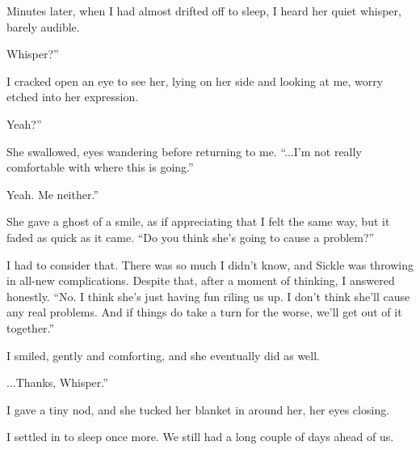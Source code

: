 Minutes later, when I had almost drifted off to sleep, I heard her quiet whisper, barely audible.

\leavevmode{}Whisper?”

I cracked open an eye to see her, lying on her side and looking at me, worry etched into her expression.

\leavevmode{}Yeah?”

She swallowed, eyes wandering before returning to me. “...I’m not really comfortable with where this is going.”

\leavevmode{}Yeah. Me neither.”

She gave a ghost of a smile, as if appreciating that I felt the same way, but it faded as quick as it came. “Do you think she’s going to cause a problem?”

I had to consider that. There was so much I didn’t know, and Sickle was throwing in all-new complications. Despite that, after a moment of thinking, I answered honestly. “No. I think she’s just having fun riling us up. I don’t think she’ll cause any real problems. And if things do take a turn for the worse, we’ll get out of it together.”

I smiled, gently and comforting, and she eventually did as well.

\leavevmode{}...Thanks, Whisper.”

I gave a tiny nod, and she tucked her blanket in around her, her eyes closing.

I settled in to sleep once more. We still had a long couple of days ahead of us.